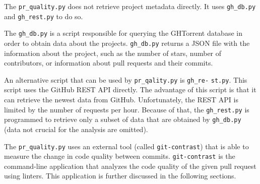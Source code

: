 \documentclass[digital,oneside,oldtable,nolof,nolot,nocover]{fithesis4}
\begin{document}
The \texttt{pr\_quality.py} does not retrieve project metadata directly. It uses \texttt{gh\_db.py} and
\texttt{gh\_rest.py} to do so.

The \texttt{gh\_db.py} is a script responsible for querying the GHTorrent database in order to
obtain data about the projects. \texttt{gh\_db.py} returns a JSON file
with the information about the project, such as the number of stars, number of
contributors, or information about pull requests and their commits.

An alternative script that can be used by \texttt{pr\_qality.py} is \texttt{gh\_re-} \texttt{st.py}.
This script uses the GitHub REST API directly. The advantage of this
script is that it can retrieve the newest data from GitHub. Unfortunately,
the REST API is limited by the number of requests per hour. Because of that,
the \texttt{gh\_rest.py} is programmed to retrieve only a subset of data that are
obtained by \texttt{gh\_db.py} (data not crucial for the analysis are
omitted).

The \texttt{pr\_quality.py} uses an external tool (called \texttt{git-contrast}) that is able
to measure the change in code quality between commits.
\texttt{git-contrast} is the command-line application that analyzes the code quality
of the given pull request using linters. This application is
further discussed in the following sections.
\end{document}
